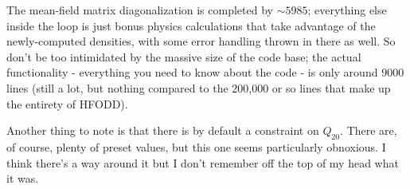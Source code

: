 The mean-field matrix diagonalization is completed by $\sim5985$; everything else inside the loop is just bonus physics calculations that take advantage of the newly-computed densities, with some error handling thrown in there as well. So don't be too intimidated by the massive size of the code base; the actual functionality - everything you need to know about the code - is only around 9000 lines (still a lot, but nothing compared to the 200,000 or so lines that make up the entirety of HFODD).

Another thing to note is that there is by default a constraint on $Q_{20}$. There are, of course, plenty of preset values, but this one seems particularly obnoxious. I think there's a way around it but I don't remember off the top of my head what it was.
